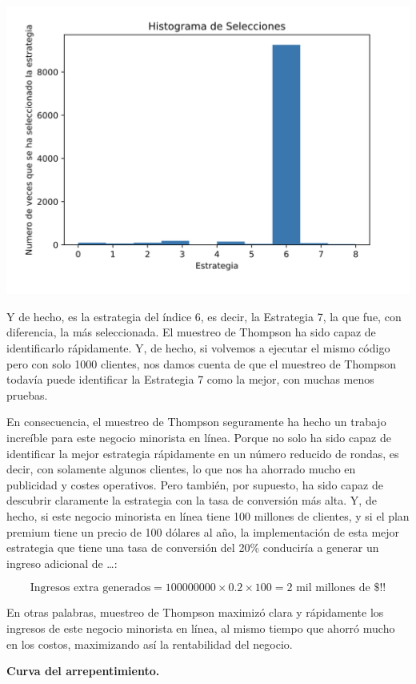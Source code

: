 \documentclass[
]{book}
\begin{document}
\includegraphics{Images/Histogram.png}

Y de hecho, es la estrategia del índice 6, es decir, la Estrategia 7, la que fue, con diferencia, la más seleccionada. El muestreo de Thompson ha sido capaz de identificarlo rápidamente. Y, de hecho, si volvemos a ejecutar el mismo código pero con solo 1000 clientes, nos damos cuenta de que el muestreo de Thompson todavía puede identificar la Estrategia 7 como la mejor, con muchas menos pruebas.

En consecuencia, el muestreo de Thompson seguramente ha hecho un trabajo increíble para este negocio minorista en línea. Porque no solo ha sido capaz de identificar la mejor estrategia rápidamente en un número reducido de rondas, es decir, con solamente algunos clientes, lo que nos ha ahorrado mucho en publicidad y costes operativos. Pero también, por supuesto, ha sido capaz de descubrir claramente la estrategia con la tasa de conversión más alta. Y, de hecho, si este negocio minorista en línea tiene 100 millones de clientes, y si el plan premium tiene un precio de 100 dólares al año, la implementación de esta mejor estrategia que tiene una tasa de conversión del 20\% conduciría a generar un ingreso adicional de \ldots:

\[\textrm{Ingresos extra generados} = 100000000 \times 0.2 \times 100 = \textrm{2 mil millones de }\$!!\]

En otras palabras, muestreo de Thompson maximizó clara y rápidamente los ingresos de este negocio minorista en línea, al mismo tiempo que ahorró mucho en los costos, maximizando así la rentabilidad del negocio.

\textbf{Curva del arrepentimiento.}
\end{document}
